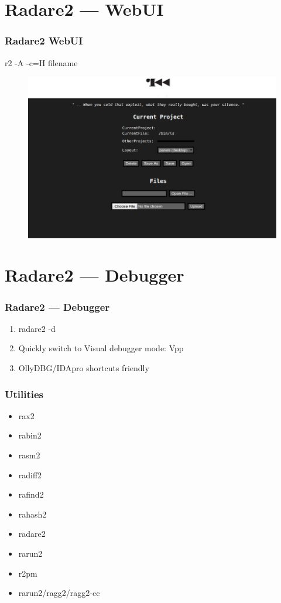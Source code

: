 \documentclass[10pt,pdf,utf8,english,compress,hyperref={unicode}]{beamer}
\begin{document}
\section{Radare2 — WebUI}
\begin{frame}[fragile]
  \frametitle{Radare2 WebUI}
  r2 -A -c=H filename
  \begin{figure}
  \includegraphics[width=\textwidth]{web.png}
  \end{figure}
\end{frame}

\section{Radare2 — Debugger}

\begin{frame}[fragile]
  \frametitle{Radare2 — Debugger}
  \begin{enumerate}
  \item radare2 -d
  \item Quickly switch to Visual debugger mode: Vpp
  \item OllyDBG/IDApro shortcuts friendly
 \end{enumerate}
\end{frame}

\begin{frame}[fragile]
  \frametitle{Utilities}
     \begin{itemize}
        \item rax2
        \item rabin2
        \item rasm2
        \item radiff2
        \item rafind2
        \item rahash2
        \item radare2
        \item \alert{rarun2}
				\item r2pm
        \item rarun2/ragg2/ragg2-cc
      \end{itemize}
\end{frame}
\end{document}
